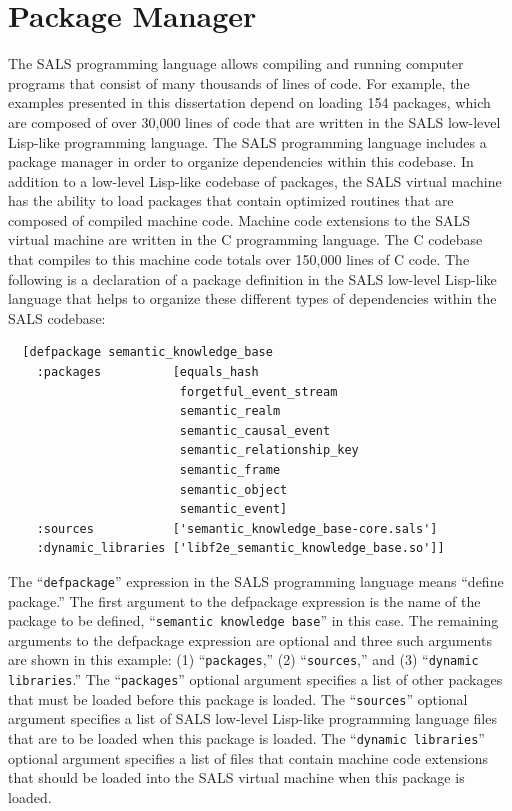 \section{Package Manager}

The SALS programming language allows compiling and running computer
programs that consist of many thousands of lines of code.  For
example, the examples presented in this dissertation depend on loading
154 packages, which are composed of over 30,000 lines of code that are
written in the SALS low-level Lisp-like programming language.  The
SALS programming language includes a package manager in order to
organize dependencies within this codebase.  In addition to a
low-level Lisp-like codebase of packages, the SALS virtual machine has
the ability to load packages that contain optimized routines that are
composed of compiled machine code.  Machine code extensions to the
SALS virtual machine are written in the C programming language.  The C
codebase that compiles to this machine code totals over 150,000 lines
of C code.  The following is a declaration of a package definition in
the SALS low-level Lisp-like language that helps to organize these
different types of dependencies within the SALS codebase:
\begin{samepage}
\begin{Verbatim}
  [defpackage semantic_knowledge_base
    :packages          [equals_hash
                        forgetful_event_stream
                        semantic_realm
                        semantic_causal_event
                        semantic_relationship_key
                        semantic_frame
                        semantic_object
                        semantic_event]
    :sources           ['semantic_knowledge_base-core.sals']
    :dynamic_libraries ['libf2e_semantic_knowledge_base.so']]
\end{Verbatim}
\end{samepage}
The ``{\tt{defpackage}}'' expression in the SALS programming language
means ``define package.''  The first argument to the defpackage
expression is the name of the package to be defined, ``{\tt{semantic
    knowledge base}}'' in this case.  The remaining arguments to the
defpackage expression are optional and three such arguments are shown
in this example: (1) ``{\tt{packages}},'' (2) ``{\tt{sources}},'' and
(3) ``{\tt{dynamic libraries}}.''  The ``{\tt{packages}}'' optional
argument specifies a list of other packages that must be loaded before
this package is loaded.  The ``{\tt{sources}}'' optional argument
specifies a list of SALS low-level Lisp-like programming language
files that are to be loaded when this package is loaded.  The
``{\tt{dynamic libraries}}'' optional argument specifies a list of
files that contain machine code extensions that should be loaded into
the SALS virtual machine when this package is loaded.

